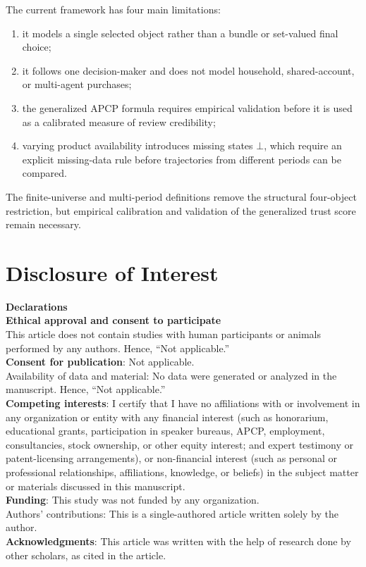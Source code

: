 \documentclass[conference]{IEEEtran}
\theoremstyle{plain}
\theoremstyle{definition}
\theoremstyle{remark}
\begin{document}
	The current framework has four main limitations:
	\begin{enumerate}[label=(\roman*)]
		\item it models a single selected object rather than a bundle or set-valued final choice;
		\item it follows one decision-maker and does not model household, shared-account, or multi-agent purchases;
		\item the generalized APCP formula requires empirical validation before it is used as a calibrated measure of review credibility;
		\item varying product availability introduces missing states $\bot$, which require an explicit missing-data rule before trajectories from different periods can be compared.
	\end{enumerate}
	The finite-universe and multi-period definitions remove the structural four-object restriction, but empirical calibration and validation of the generalized trust score remain necessary.
	\section*{Disclosure of Interest}
	\noindent \textbf{Declarations}\\
	\textbf{Ethical approval and consent to participate}\\
	This article does not contain studies with human participants or animals performed by any authors. Hence, ``Not applicable.''\\
	\textbf{Consent for publication}: Not applicable.\\
	Availability of data and material: No data were generated or analyzed in the manuscript. Hence, ``Not applicable.''\\
	\textbf{Competing interests}: I certify that I have no affiliations with or involvement in any organization or entity with any financial interest (such as honorarium, educational grants, participation in speaker bureaus, APCP, employment, consultancies, stock ownership, or other equity interest; and expert testimony or patent-licensing arrangements), or non-financial interest (such as personal or professional relationships, affiliations, knowledge, or beliefs) in the subject matter or materials discussed in this manuscript.\\
	\textbf{Funding}: This study was not funded by any organization.\\
	Authors' contributions: This is a single-authored article written solely by the author.\\
	\textbf{Acknowledgments}: This article was written with the help of research done by other scholars, as cited in the article. \\
\end{document}
